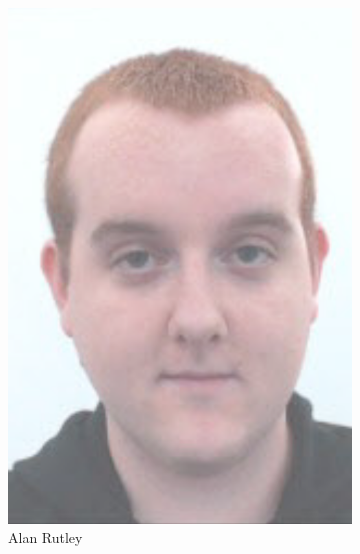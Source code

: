 \begin{figure}
    \centering
    \begin{subfigure}[b]{0.45\textwidth}
        \centering
        \includegraphics[height=0.3\textheight]{Files/AR}
        \caption{Alan Rutley}
    \end{subfigure}
    ~~~~
    \begin{subfigure}[b]{0.45\textwidth}
        \centering

\end{subfigure}
\end{figure}
